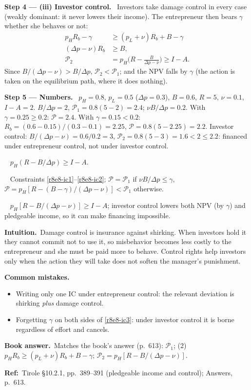 \documentclass[11pt,a4paper]{article}
\newcommand{\step}[2]{\par\medskip\noindent\textbf{Step #1 --- #2.}~}
\newcommand{\intuition}{\par\medskip\noindent\textbf{Intuition.}~}
\newcommand{\bookans}{\par\medskip\noindent\textbf{Book answer.}~}
\newcommand{\refbib}{\par\smallskip\noindent\textbf{Ref:}~}
\newcommand{\answer}[1]{\par\smallskip\noindent\fbox{\textbf{Answer #1.}}~}
\newcommand{\pitfalls}{\par\medskip\noindent\textbf{Common mistakes.}}
\newcommand{\dpp}{\Delta p}
\begin{document}
\step{4}{(iii) Investor control} Investors take damage control in every case (weakly dominant: it never lowers their income). The entrepreneur then bears $\gamma$ whether she behaves or not:
\begin{align}
  p_HR_b-\gamma &\ge (p_L+\nu)R_b+B-\gamma \label{r8e8-ic3}\\
  (\dpp-\nu)R_b &\ge B, \nonumber\\
  \mathcal P_2 &= p_H\Big(R-\frac{B}{\dpp-\nu}\Big)\ge I-A. \label{r8e8-P2}
\end{align}
Since $B/(\dpp-\nu)>B/\dpp$, $\mathcal P_2<\mathcal P_1$; and the NPV falls by $\gamma$ (the action is taken on the equilibrium path, where it does nothing).

\step{5}{Numbers} $p_H=0.8$, $p_L=0.5$ ($\dpp=0.3$), $B=0.6$, $R=5$, $\nu=0.1$, $I-A=2$. $B/\dpp=2$, $\mathcal P_1=0.8(5-2)=2.4$; $\nu B/\dpp=0.2$. With $\gamma=0.25\ge0.2$: $\mathcal P=2.4$. With $\gamma=0.15<0.2$: $R_b=(0.6-0.15)/(0.3-0.1)=2.25$, $\mathcal P=0.8(5-2.25)=2.2$. Investor control: $B/(\dpp-\nu)=0.6/0.2=3$, $\mathcal P_2=0.8(5-3)=1.6<2\le2.2$: financed under entrepreneur control, not under investor control.

\answer{(i)} $p_H(R-B/\dpp)\ge I-A$.
\answer{(ii)} Constraints \eqref{r8e8-ic1}--\eqref{r8e8-ic2}; $\mathcal P=\mathcal P_1$ if $\nu B/\dpp\le\gamma$, $\mathcal P=p_H[R-(B-\gamma)/(\dpp-\nu)]<\mathcal P_1$ otherwise.
\answer{(iii)} $p_H[R-B/(\dpp-\nu)]\ge I-A$; investor control lowers both NPV (by $\gamma$) and pledgeable income, so it can make financing impossible.

\intuition Damage control is insurance against shirking. When investors hold it they cannot commit not to use it, so misbehavior becomes less costly to the entrepreneur and she must be paid more to behave. Control rights help investors only when the action they will take does not soften the manager's punishment.

\pitfalls
\begin{itemize}
  \item Writing only one IC under entrepreneur control: the relevant deviation is shirking \emph{plus} damage control.
  \item Forgetting $\gamma$ on both sides of \eqref{r8e8-ic3}: under investor control it is borne regardless of effort and cancels.
\end{itemize}
\bookans Matches the book's answer (p.~613): $\mathcal P_1$; (2) $p_HR_b\ge(p_L+\nu)R_b+B-\gamma$; $\mathcal P_2=p_H[R-B/(\dpp-\nu)]$.
\refbib{Tirole \S10.2.1, pp.~389--391 (pledgeable income and control); Answers, p.~613.}
\end{document}

